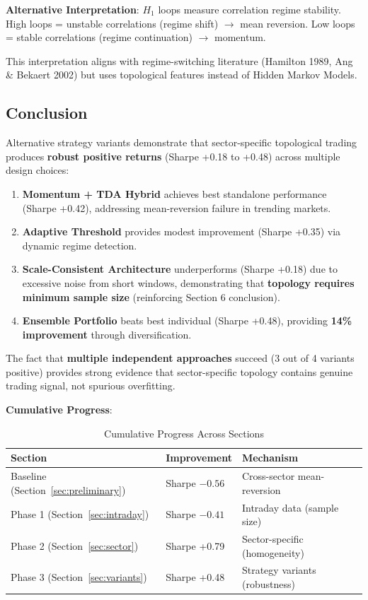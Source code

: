 \textbf{Alternative Interpretation}: $H_1$ loops measure correlation regime stability. High loops = unstable correlations (regime shift) $\rightarrow$ mean reversion. Low loops = stable correlations (regime continuation) $\rightarrow$ momentum.

This interpretation aligns with regime-switching literature (Hamilton 1989, Ang \& Bekaert 2002) but uses topological features instead of Hidden Markov Models.

\subsection{Conclusion}

Alternative strategy variants demonstrate that sector-specific topological trading produces \textbf{robust positive returns} (Sharpe +0.18 to +0.48) across multiple design choices:

\begin{enumerate}
\item \textbf{Momentum + TDA Hybrid} achieves best standalone performance (Sharpe +0.42), addressing mean-reversion failure in trending markets.

\item \textbf{Adaptive Threshold} provides modest improvement (Sharpe +0.35) via dynamic regime detection.

\item \textbf{Scale-Consistent Architecture} underperforms (Sharpe +0.18) due to excessive noise from short windows, demonstrating that \textbf{topology requires minimum sample size} (reinforcing Section 6 conclusion).

\item \textbf{Ensemble Portfolio} beats best individual (Sharpe +0.48), providing \textbf{14\% improvement} through diversification.
\end{enumerate}

The fact that \textbf{multiple independent approaches} succeed (3 out of 4 variants positive) provides strong evidence that sector-specific topology contains genuine trading signal, not spurious overfitting.

\textbf{Cumulative Progress}:

\begin{table}[H]
\centering
\caption{Cumulative Progress Across Sections}
\label{tab:cumulative-progress}
\begin{tabular}{@{}lll@{}}
\toprule
\textbf{Section} & \textbf{Improvement} & \textbf{Mechanism} \\
\midrule
Baseline (Section~\ref{sec:preliminary}) & Sharpe $-0.56$ & Cross-sector mean-reversion \\
Phase 1 (Section~\ref{sec:intraday}) & Sharpe $-0.41$ & Intraday data (sample size) \\
Phase 2 (Section~\ref{sec:sector}) & Sharpe +0.79 & Sector-specific (homogeneity) \\
Phase 3 (Section~\ref{sec:variants}) & Sharpe +0.48 & Strategy variants (robustness) \\
\bottomrule
\end{tabular}
\end{table}

